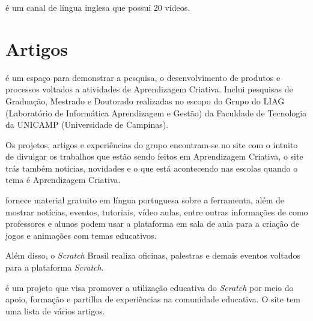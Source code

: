 \documentclass[12pt,fleqn]{book} %
\begin{document}
\textcite{blank2018} é um canal de língua inglesa que possui 20 vídeos.

\section{Artigos}

\textcite{liag2018} é um espaço para demonstrar a pesquisa, o desenvolvimento de produtos e processos voltados a atividades de Aprendizagem Criativa. Inclui pesquisas de Graduação, Mestrado e Doutorado realizadas no escopo do Grupo do LIAG (Laboratório de Informática Aprendizagem e Gestão) da Faculdade de Tecnologia da UNICAMP (Universidade de Campinas). 

Os projetos, artigos e experiências do grupo encontram-se no site com o intuito de divulgar os trabalhos que estão sendo feitos em Aprendizagem Criativa, o site trás também noticias, novidades e o que está acontecendo nas escolas quando o tema é Aprendizagem Criativa.

\textcite{scratchbrasil2018} fornece material gratuito em língua portuguesa sobre a ferramenta, além de mostrar notícias, eventos, tutoriais, vídeo aulas, entre outras informações de como professores e alunos podem usar a plataforma em sala de aula para a criação de jogos e animações com temas educativos.

Além disso, o \textit{Scratch} Brasil realiza oficinas, palestras e demais eventos voltados para a plataforma \textit{Scratch}.

\textcite{eduscratch2018} é um projeto que visa promover a utilização educativa do \textit{Scratch} por meio do apoio, formação e partilha de experiências na comunidade educativa. O site tem uma lista de vários artigos. 




\end{document}
